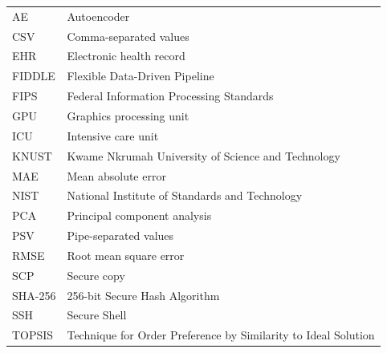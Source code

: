 \begin{tabularx}{\linewidth}{@{}lX@{}}
AE & Autoencoder \\
CSV & Comma-separated values \\
EHR & Electronic health record \\
FIDDLE & Flexible Data-Driven Pipeline \\
FIPS & Federal Information Processing Standards \\
GPU & Graphics processing unit \\
ICU & Intensive care unit \\
KNUST & Kwame Nkrumah University of Science and Technology \\
MAE & Mean absolute error \\
NIST & National Institute of Standards and Technology \\
PCA & Principal component analysis \\
PSV & Pipe-separated values \\
RMSE & Root mean square error \\
SCP & Secure copy \\
SHA-256 & 256-bit Secure Hash Algorithm \\
SSH & Secure Shell \\
TOPSIS & Technique for Order Preference by Similarity to Ideal Solution
\end{tabularx}
